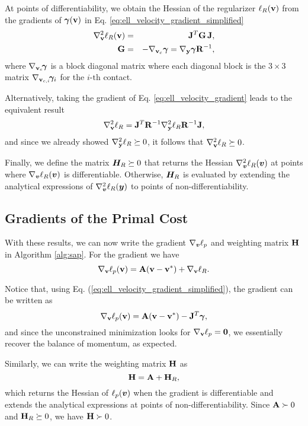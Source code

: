 At points of differentiability, we obtain the Hessian of the regularizer
$\ell_R({\mathbf{v}})$ from the gradients of ${\bm\gamma}({\mathbf{v}})$ in Eq.
\eqref{eq:ell_velocity_gradient_simplified}
\begin{eqnarray}
	\nabla_\mf{v}^2\ell_R(\mf{v}) &=& \mf{J}^T\mf{G}\,\mf{J}\nonumber,\\
	\mf{G} &=&-\nabla_{\mf{v}_c}\bgamma = \nabla_\mf{y}\bgamma \mf{R}^{-1},
	\label{eq:ellR_hessian}
\end{eqnarray}
where $\nabla_{{\mathbf{v}}_c}\!{\bm\gamma}$ is a block diagonal matrix where each
diagonal block is the $3\times 3$ matrix $\nabla_{{\mathbf{v}}_{c,i}}\!{\bm\gamma}_i$
for the $i\text{-th}$ contact.

Alternatively, taking the gradient of Eq. \eqref{eq:ell_velocity_gradient} leads to the equivalent result
\begin{equation*}
	\nabla_{\mathbf{v}}^2\ell_R = {\mathbf{J}}^T{\mathbf{R}}^{-1}\nabla_{\mathbf{y}}^2\ell_R{\mathbf{R}}^{-1}{\mathbf{J}},
\end{equation*}
and since we already showed $\nabla_{\mathbf{y}}^2\ell_R\succeq 0$, it follows that
$\nabla_{\mathbf{v}}^2\ell_R\succeq 0$.

Finally, we define the matrix ${\bm{H}}_R \succeq 0$ that returns the Hessian
$\nabla_{\bm{v}}^2\ell_R({\bm{v}})$ at points where $\nabla_{\bm{v}}\ell_R({\bm{v}})$ is
differentiable. Otherwise, ${\bm{H}}_R$ is evaluated by extending the analytical
expressions of $\nabla_{\bm{v}}^2\ell_R({\bm{y}})$ to points of
non-differentiability.

\subsection{Gradients of the Primal Cost}
With these results, we can now write the gradient $\nabla_{\bm{v}}\ell_p$ and weighting matrix ${\mathbf{H}}$ in Algorithm \ref{alg:sap}. For the gradient we
have
\begin{equation*}
	\nabla_{\mathbf{v}}\ell_p({\mathbf{v}}) = {\mathbf{A}}({\mathbf{v}}-{\mathbf{v}}^*) + \nabla_{\mathbf{v}}\ell_R.
\end{equation*}

Notice that, using Eq. (\ref{eq:ell_velocity_gradient_simplified}), the gradient
can be written as
\begin{equation*}
	\nabla_{\mathbf{v}}\ell_p({\mathbf{v}}) = {\mathbf{A}}({\mathbf{v}}-{\mathbf{v}}^*) - {\mathbf{J}}^T{\bm\gamma},
\end{equation*}
and since the unconstrained minimization looks for $\nabla_{\mathbf{v}}\ell_p={\mathbf{0}}$,
we essentially recover the balance of momentum, as expected.

Similarly, we can write the weighting matrix ${\mathbf{H}}$ as
\begin{equation*}
	{\mathbf{H}} = {\mathbf{A}} + {\mathbf{H}}_R,
\end{equation*}
which returns the Hessian of $\ell_p({\bm{v}})$ when the gradient is
differentiable and extends the analytical expressions at points of
non-differentiability. Since ${\mathbf{A}}\succ 0$ and ${\mathbf{H}}_R \succeq 0$, we have
${\mathbf{H}}\succ 0$.
